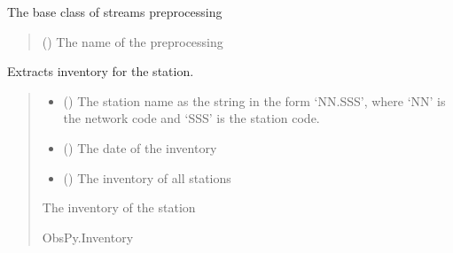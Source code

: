 \documentclass[letterpaper,10pt,english]{sphinxmanual}
\begin{document}
\begin{fulllineitems}
\label{\detokenize{api_core:amw.core.signal_utils.StreamPreprocessing}}
\pysigstartsignatures
{}
\pysigstopsignatures
\sphinxAtStartPar
The base class of streams preprocessing
\begin{quote}\begin{description}
\sphinxAtStartPar
{} () \textendash{} The name of the preprocessing

\end{description}\end{quote}

\end{fulllineitems}


\begin{fulllineitems}
\label{\detokenize{api_core:amw.core.signal_utils.get_inventory}}
\pysigstartsignatures
{}
\pysigstopsignatures
\sphinxAtStartPar
Extracts inventory for the station.
\begin{quote}\begin{description}
\begin{itemize}
\item {} 
\sphinxAtStartPar
{} () \textendash{} The station name as the string in the form ‘NN.SSS’,
where ‘NN’ is the network code and ‘SSS’ is the station code.

\item {} 
\sphinxAtStartPar
{} () \textendash{} The date of the inventory

\item {} 
\sphinxAtStartPar
{} () \textendash{} The inventory of all stations

\end{itemize}

\sphinxAtStartPar
The inventory of the station

\sphinxAtStartPar
ObsPy.Inventory

\end{description}\end{quote}

\end{fulllineitems}
\end{document}
